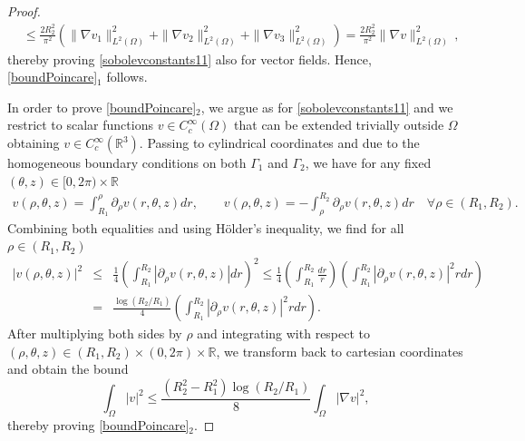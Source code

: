 \documentclass[a4paper,11pt]{amsart}
\numberwithin{equation}{section}
\numberwithin{figure}{section}
\newcommand{\R}{\mathbb{R}}
\begin{document}
\begin{proof}
$$\begin{aligned}
			& \leq \frac{2R_2^2}{\pi^2} \left( \| \nabla v_{1}\|^{2}_{L^2(\Omega)} + \| \nabla v_{2}\|^{2}_{L^2(\Omega)}+ \| \nabla v_3\|^{2}_{L^2(\Omega)}\right)
			=\frac{2R_2^2}{\pi^2}\| \nabla v \|^{2}_{L^2(\Omega)} \, ,
		\end{aligned}
		$$
		thereby proving \eqref{sobolevconstants11} also for vector fields. Hence, \eqref{boundPoincare}$_1$ follows.\par
		In order to prove \eqref{boundPoincare}$_2$, we argue as for \eqref{sobolevconstants11} and we restrict to scalar functions $v\in C^\infty_c(\Omega)$ that can be extended trivially outside
		$\Omega$ obtaining $v\in C^\infty_c(\R^3)$. Passing to cylindrical coordinates and due to the homogeneous boundary conditions on both $\Gamma_1$ and $\Gamma_2$, we have 
	for any fixed $(\theta,z)\in[0,2\pi)\times\R$ 
	\begin{eqnarray*}
		v(\rho,\theta, z)=
		\int_{R_1}^\rho\partial_\rho v(r, \theta, z) dr, \qquad
		v(\rho, \theta,z)=
		-\int_\rho^{R_2}\partial_\rho v(r, \theta, z) dr\quad\forall\rho\in(R_1,R_2).
	\end{eqnarray*}
	Combining both equalities and using H\"older's inequality, we find for all $\rho\in(R_1,R_2)$ 
	\begin{eqnarray*}
		|v(\rho,\theta,z)|^2&\le&
	\frac{1}{4}	\left(\int_{R_1}^{R_2}\left| \partial_\rho v(r, \theta, z)\right|dr\right)^2\le	\frac{1}{4}\left(\int_{R_1}^{R_2} \frac{dr}{r} \right)\left(\int_{R_1}^{R_2}\left|\partial_\rho v(r, \theta, z)\right|^2r dr\right)\, \\&=& \frac{\log\left(R_2/R_1\right)}{4} \left(\int_{R_1}^{R_2}\left|\partial_\rho v(r, \theta, z)\right|^2r dr\right).
	\end{eqnarray*}
	After multiplying both sides by $\rho$ and integrating with respect to $(\rho, \theta, z)\in (R_1,R_2)\times (0,2\pi)\times \mathbb{R}$, we transform back to cartesian coordinates and obtain the bound
	\begin{equation}
		\int_\Omega |v|^2\leq \frac{(R_2^2 - R_1^2) \log\left(R_2/R_1\right) }{8}\int_\Omega |\nabla v|^2,
	\end{equation}
		thereby proving \eqref{boundPoincare}$_2$.		
	\end{proof}
	
\end{document}
